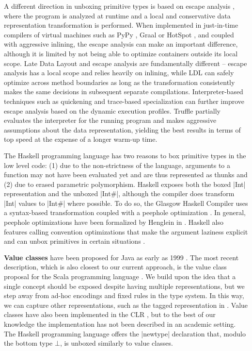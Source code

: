 A different direction in unboxing primitive types is based on escape analysis \cite{escape-analysis-first-paper}, where the program is analyzed at runtime and a local and conservative data representation transformation is performed. When implemented in just-in-time compilers \cite{stadler-escape-analysis} of virtual machines such as PyPy \cite{bolz-pypy-tracing-jit}, Graal \cite{graal} or HotSpot \cite{hotspot-c2}, and coupled with aggressive inlining, the escape analysis can make an important difference, although it is limited by not being able to optimize containers outside its local scope. Late Data Layout and escape analysis are fundamentally different -- escape analysis has a local scope and relies heavily on inlining, while LDL can safely optimize across method boundaries as long as the transformation consistently makes the same decisions in subsequent separate compilations. Interpreter-based techniques such as quickening \cite{quickening} and trace-based specialization \cite{tracemonkey} can further improve escape analysis based on the dynamic execution profiles. Truffle \cite{truffle} partially evaluates the interpreter for the running program and makes aggressive assumptions about the data representation, yielding the best results in terms of top speed at the expense of a longer warm-up time.

The Haskell programming language has two reasons to box primitive types in the low level code: (1) due to the non-strictness of the language, arguments to a function may not have been evaluated yet and are thus represented as thunks and (2) due to erased parametric polymorphism. Haskell exposes both the boxed |Int| representation and the unboxed |Int#|, although the compiler does transform |Int| values to |Int#| where possible. To do so, the Glasgow Haskell Compiler uses a syntax-based transformation coupled with a peephole optimization \cite{spj-unboxed-values, launchbury-unpointed}. In general, peephole optimizations have been formalized by Henglein in \cite{henglein-formally-optimal-boxing}. Haskell also features calling convention optimizations that make the argument laziness explicit and can unbox primitives in certain situations \cite{bolingbroke-haskell-calling-conventions}.

\textbf{Value classes} have been proposed for Java as early as 1999 \cite{gosling-value-classes, rose-value-classes-vm, rose-value-classes-tearing}. The most recent description, which is also closest to our current approach, is the value class proposal for the Scala programming language \cite{sip-value-classes}. We build upon the idea that a single concept should be exposed despite having multiple representations, but we step away from ad-hoc encodings and fixed rules in the type system. In this way, we can capture other representations, such as the tagged representation in \cite{morrison-napier88}. Value classes have also been implemented in the CLR \cite{dot-net-value-types-www}, but to the best of our knowledge the implementation has not been described in an academic setting. The Haskell programming language offers the |newtype| declaration \cite{haskell-newtype} that, modulo the bottom type $\bot$, is unboxed similarly to value classes.

